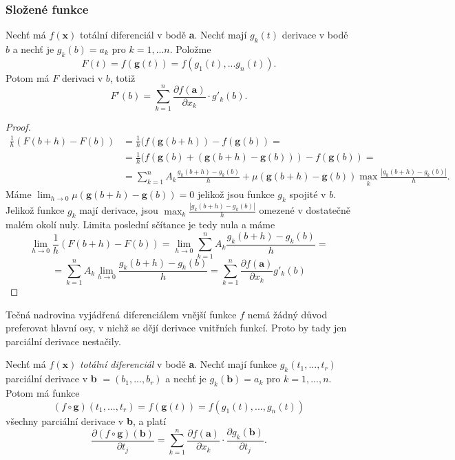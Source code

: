 \documentclass[../main.tex]{subfiles}
\begin{document}
\subsubsection{Složené funkce}
\begin{theorem}\label{th:dsf}
	Nechť má $f(\textbf{x})$ totální diferenciál v bodě \textbf{a}. Nechť mají $g_k(t)$ derivace v bodě $b$ a nechť je $g_k(b) = a_k$ pro 
	$k = 1,...n.$ Položme
	\[F(t) = f(\textbf{g}(t)) = f(g_1(t),...g_n(t)).\]
	Potom má $F$ derivaci v $b$, totiž 
	\[F'(b) = \sum^n_{k=1}\frac{\partial f(\textbf{a})}{\partial x_k} \cdot g'_k(b).\]
\end{theorem}

\begin{proof}
	\begin{align*} 
	 \frac{1}{h} (F(b+h) - F(b)) &= \frac{1}{h}(f(\textbf{g}(b+h)) - f(\textbf{g}(b)) =  \\
	 &=\frac{1}{h}(f(\textbf{g}(b) + (\textbf{g}(b+h) - \textbf{g}(b))) - f(\textbf{g}(b)) = \\
	 &=\sum^n_{k=1}A_k\frac{g_k(b+h)-g_k(b)}{h} + \mu(\textbf{g}(b+h) - \textbf{g}(b)) \max_k\frac{|g_k(b+h)-g_k(b)|}{h}.
	\end{align*}
	Máme $\lim_{h \rightarrow 0} \mu(\textbf{g}(b+h)-\textbf{g}(b)) = 0$ jelikož jsou funkce $g_k$ spojité v $b$. 
	Jelikož funkce $g_k$ mají derivace, jsou $\max_k \frac{|g_k(b+h) - g_k(b)|}{h}$ omezené v dostatečně malém okolí nuly. Limita 
	poslední sčítance je tedy nula a máme
	\[\lim_{h \rightarrow 0} \frac{1}{h}(F(b+h) - F(b)) = \lim_{h \rightarrow 0} \sum^n_{k = 1} A_k\frac{g_k(b+h)-g_k(b)}{h} = \]
	\[= \sum^n_{k = 1}A_k\lim_{h \rightarrow 0} \frac{g_k(b+h) - g_k(b)}{h} = \sum^n_{k = 1}\frac{\partial f(\textbf{a})}{\partial x_k}g'_k(b)\]
\end{proof}

\begin{intuition}
	Tečná nadrovina vyjádřená diferenciálem vnější funkce $f$ nemá žádný důvod preferovat hlavní osy, v nichž se 
	dějí derivace vnitřních funkcí. Proto by tady jen parciální derivace nestačily.
\end{intuition}

\begin{theorem}
	Nechť má $f(\textbf{x})$ \textit{totální diferenciál} v bodě \textbf{a}. Nechť mají funkce $g_k(t_1,...,t_r)$ parciální 
	derivace v \textbf{b} $= (b_1,...,b_r)$ a nechť je $g_k(\textbf{b}) = a_k$ pro $k = 1,...,n.$ Potom má funkce
	\[(f\circ \textbf{g})(t_1,...,t_r) = f(\textbf{g}(t)) = f(g_1(t),...,g_n(t))\]
	všechny parciální derivace v \textbf{b}, a platí 
	\[\frac{\partial (f \circ \textbf{g})(\textbf{b})}{\partial t_j} = \sum^n_{k=1}\frac{\partial f(\textbf{a})}{\partial x_k}
	\cdot \frac{\partial g_k(\textbf{b})}{\partial t_j}.\]
\end{theorem}
\end{document}
